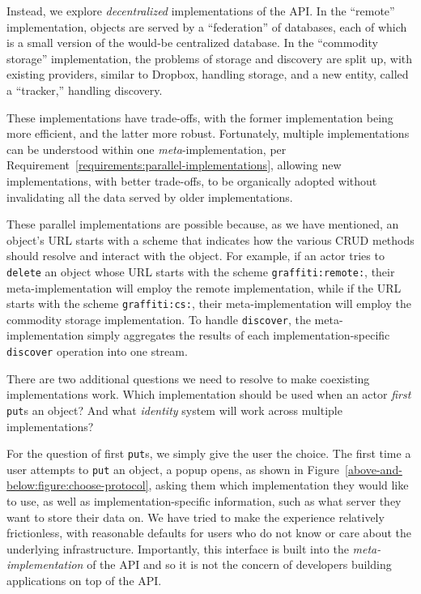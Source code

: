 Instead, we explore \emph{decentralized} implementations of the API.
In the ``remote'' implementation, objects are served by a ``federation'' of databases,
each of which is a small version of the would-be centralized database.
In the ``commodity storage'' implementation, the problems of storage and discovery are split up,
with existing providers, similar to Dropbox, handling storage,
and a new entity, called a ``tracker,'' handling discovery.

These implementations have trade-offs, with
the former implementation being more efficient,
and the latter more robust.
Fortunately, multiple implementations can be understood within one \emph{meta}-implementation,
per Requirement~\ref{requirements:parallel-implementations},
allowing new implementations,
with better trade-offs, to be organically adopted without
invalidating all the data served by older implementations.

These parallel implementations are possible because, as we have mentioned, an object's URL starts with a scheme that indicates
how the various CRUD methods should resolve and interact with the object.
For example, if an actor tries to \texttt{delete} an object whose URL starts with the scheme
\texttt{graffiti:remote:}, their meta-implementation will employ the remote implementation,
while if the URL starts with the scheme \texttt{graffiti:cs:},
their meta-implementation will employ the commodity storage implementation.
To handle \texttt{discover}, the meta-implementation simply aggregates
the results of each implementation-specific \texttt{discover}
operation into one stream.

There are two additional questions we need to resolve to
make coexisting implementations work.
Which implementation should be used
when an actor \emph{first} \texttt{put}s an object?
And what \emph{identity} system will work across multiple
implementations?

For the question of first \texttt{put}s, we simply give the user the choice.
The first time a user attempts to \texttt{put} an object,
a popup opens,
as shown in Figure~\ref{above-and-below:figure:choose-protocol},
asking them which implementation they would like to use,
as well as implementation-specific information, such as what server
they want to store their data on.
We have tried to make the experience relatively frictionless, with
reasonable defaults for
users who do not know or care about the underlying infrastructure.
Importantly, this interface is built into the \emph{meta-implementation}
of the API and so it is not the concern of developers building
applications on top of the API.

